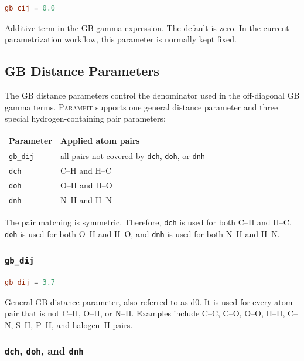 \documentclass[11pt]{article}
\begin{document}
\begin{lstlisting}[language=toml]
gb_cij = 0.0
\end{lstlisting}

Additive term in the GB gamma expression. The default is zero. In the current
parametrization workflow, this parameter is normally kept fixed.

\subsection{GB Distance Parameters}

The GB distance parameters control the denominator used in the off-diagonal GB
gamma terms. \textsc{Paramfit} supports one general distance parameter and three
special hydrogen-containing pair parameters:

\begin{center}
\begin{tabular}{ll}
\toprule
Parameter & Applied atom pairs \\
\midrule
\texttt{gb\_dij} & all pairs not covered by \texttt{dch}, \texttt{doh}, or \texttt{dnh} \\
\texttt{dch} & C--H and H--C \\
\texttt{doh} & O--H and H--O \\
\texttt{dnh} & N--H and H--N \\
\bottomrule
\end{tabular}
\end{center}

The pair matching is symmetric. Therefore, \texttt{dch} is used for both C--H
and H--C, \texttt{doh} is used for both O--H and H--O, and \texttt{dnh} is used
for both N--H and H--N.

\subsubsection{\texttt{gb\_dij}}

\begin{lstlisting}[language=toml]
gb_dij = 3.7
\end{lstlisting}

General GB distance parameter, also referred to as d0. It is used for every atom
pair that is not C--H, O--H, or N--H. Examples include C--C, C--O, O--O, H--H,
C--N, S--H, P--H, and halogen--H pairs.

\subsubsection{\texttt{dch}, \texttt{doh}, and \texttt{dnh}}
\end{document}
